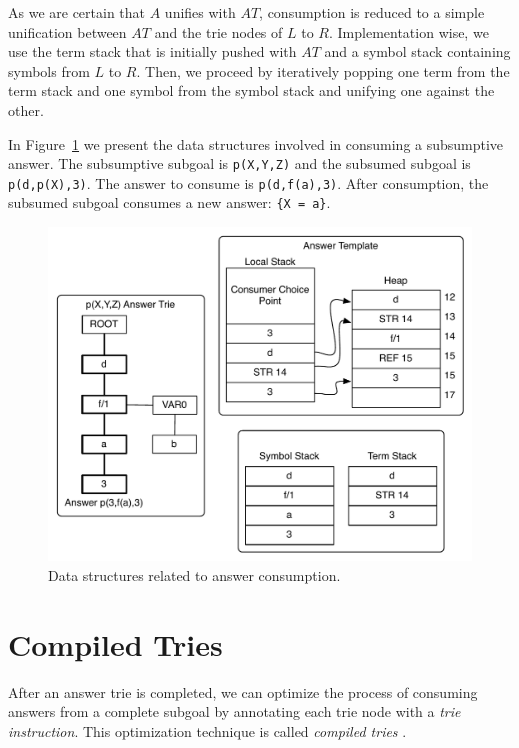 As we are certain that $A$ unifies with $AT$, consumption is reduced to a simple unification
between $AT$ and the trie nodes of $L$ to $R$.
Implementation wise, we use the term stack that is initially pushed with $AT$
and a symbol stack containing symbols from $L$ to $R$. Then, we proceed by
iteratively popping one term from the term stack and one symbol from the symbol stack
and unifying one against the other.

In Figure~\ref{fig:consume_answer} we present the data structures involved in consuming
a subsumptive answer. The subsumptive subgoal is \texttt{p(X,Y,Z)} and the
subsumed subgoal is \texttt{p(d,p(X),3)}. The answer to consume is \texttt{p(d,f(a),3)}.
After consumption, the subsumed subgoal consumes a new answer: \texttt{\{X~=~a\}}.

\begin{figure}[H]
  \centering
    \includegraphics[scale=0.6]{consume_answer.pdf}
  \caption{Data structures related to answer consumption.}
  \label{fig:consume_answer}
\end{figure}

\section{Compiled Tries}\label{sec:compiled_tries}

After an answer trie is completed, we can optimize the process of consuming answers from a complete
subgoal by annotating each trie node with a \textit{trie instruction}. This optimization technique
is called \textit{compiled tries} \cite{RamakrishnanIV-99}.

